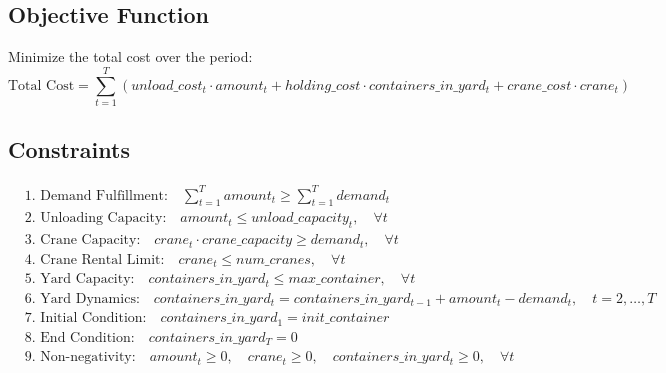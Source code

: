 \documentclass{article}
\begin{document}
\subsection*{Objective Function}
Minimize the total cost over the period:
\[
\text{Total Cost} = \sum_{t=1}^{T} (unload\_cost_t \cdot amount_t + holding\_cost \cdot containers\_in\_yard_t + crane\_cost \cdot crane_t)
\]

\subsection*{Constraints}
\begin{align}
    & \text{1. Demand Fulfillment:} \quad \sum_{t=1}^{T} amount_t \geq \sum_{t=1}^{T} demand_t \\
    & \text{2. Unloading Capacity:} \quad amount_t \leq unload\_capacity_t, \quad \forall t \\
    & \text{3. Crane Capacity:} \quad crane_t \cdot crane\_capacity \geq demand_t, \quad \forall t \\
    & \text{4. Crane Rental Limit:} \quad crane_t \leq num\_cranes, \quad \forall t \\
    & \text{5. Yard Capacity:} \quad containers\_in\_yard_t \leq max\_container, \quad \forall t \\
    & \text{6. Yard Dynamics:} \quad containers\_in\_yard_t = containers\_in\_yard_{t-1} + amount_t - demand_t, \quad t = 2, \ldots, T \\
    & \text{7. Initial Condition:} \quad containers\_in\_yard_1 = init\_container \\
    & \text{8. End Condition:} \quad containers\_in\_yard_T = 0 \\
    & \text{9. Non-negativity:} \quad amount_t \geq 0, \quad crane_t \geq 0, \quad containers\_in\_yard_t \geq 0, \quad \forall t
\end{align}
\end{document}

